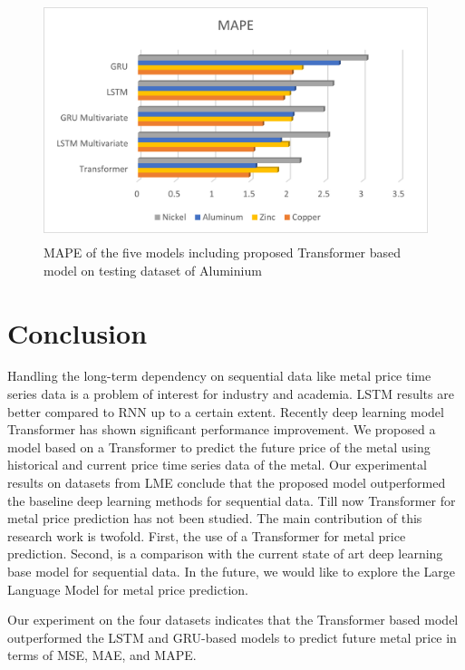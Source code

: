 \documentclass{ws-ijait}
\begin{document}
\begin{center}
	\begin{figure}[!htbp]
		\centering
		\includegraphics[width=15cm, height=7cm]{MAPE.png}
		\caption{MAPE of the five models including proposed Transformer based model on testing dataset of Aluminium}
		\label{figr1}
	\end{figure}
\end{center}

\section{Conclusion}
Handling the long-term dependency on sequential data like metal price time series data is a problem of interest for industry and academia. LSTM results are better compared to RNN up to a certain extent. Recently deep learning model Transformer has shown significant performance improvement. We proposed a model based on a Transformer to predict the future price of the metal using historical and current price time series data of the metal. Our experimental results on datasets from LME conclude that the proposed model outperformed the baseline deep learning methods for sequential data. Till now Transformer for metal price prediction has not been studied. The main contribution of this research work is twofold. First, the use of a Transformer for metal price prediction. Second, is a comparison with the current state of art deep learning base model for sequential data. In the future, we would like to explore the Large Language Model for metal price prediction.  
\par Our experiment on the four datasets indicates that the Transformer based model outperformed the LSTM and GRU-based models to predict future metal price in terms of MSE, MAE, and MAPE. 

 

\end{document}
